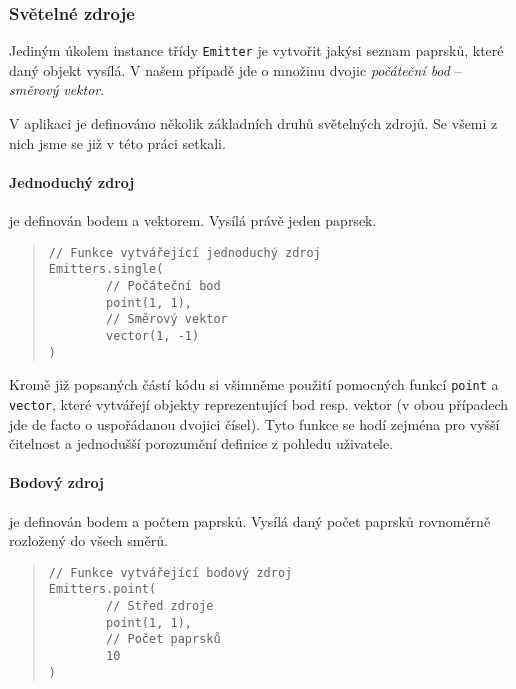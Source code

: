 \subsubsection{Světelné zdroje}

Jediným úkolem instance třídy \texttt{Emitter} je vytvořit jakýsi seznam paprsků, které daný objekt vysílá. V našem případě jde o množinu dvojic \emph{počáteční bod} -- \emph{směrový vektor}.

V aplikaci je definováno několik základních druhů světelných zdrojů. Se všemi z nich jsme se již v této práci setkali.

\paragraph{Jednoduchý zdroj} je definován bodem a vektorem. Vysílá právě jeden paprsek.

\begin{minipage}{\textwidth}\begin{quote}\begin{lstlisting}
// Funkce vytvářející jednoduchý zdroj
Emitters.single(
        // Počáteční bod
        point(1, 1),
        // Směrový vektor
        vector(1, -1)
)
\end{lstlisting}\end{quote}\end{minipage}


Kromě již popsaných částí kódu si všimněme použití pomocných funkcí \texttt{point} a \texttt{vector}, které vytvářejí objekty reprezentující bod resp. vektor (v obou případech jde de facto o uspořádanou dvojici čísel). Tyto funkce se hodí zejména pro vyšší čitelnost a jednodušší porozumění definice z pohledu uživatele.

\paragraph{Bodový zdroj} je definován bodem a počtem paprsků. Vysílá daný počet paprsků rovnoměrně rozložený do všech směrů.

\begin{minipage}{\textwidth}\begin{quote}\begin{lstlisting}
// Funkce vytvářející bodový zdroj
Emitters.point(
        // Střed zdroje
        point(1, 1),
        // Počet paprsků
        10
)
\end{lstlisting}\end{quote}\end{minipage}

